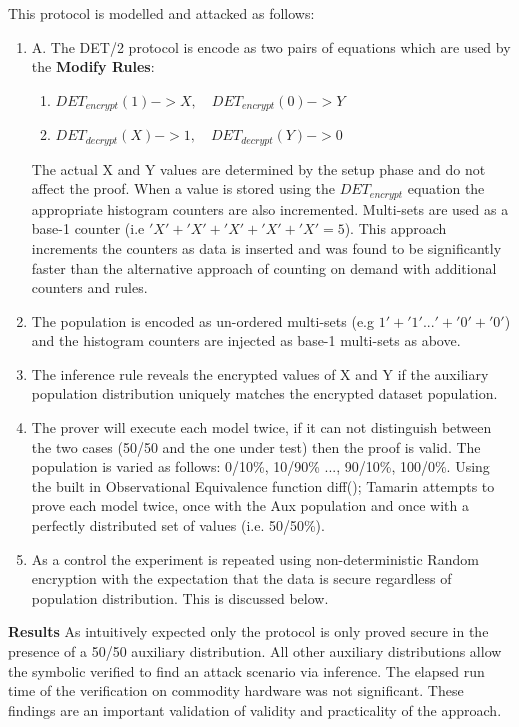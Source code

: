 \documentclass[journal]{IEEEtran}
\begin{document}
This protocol is modelled and attacked as follows:
\begin{enumerate}[label=(\Alph*)]
        \item A. The DET/2 protocol is encode as two pairs of equations which are used by the \textbf{Modify Rules}:
    \begin{enumerate}
        \item 	$DET_{encrypt}(1) -> X,\quad	DET_{encrypt}(0) -> Y$
    	\item 	$DET_{decrypt}(X) ->  1,\quad   DET_{decrypt}(Y) ->  0$
        
    \end{enumerate}
    The actual X and Y values are determined by the setup phase and do not affect the proof.
	When a value is stored using the $DET_{encrypt}$ equation the appropriate histogram counters are also incremented. Multi-sets are used as a base-1 counter (i.e $'X'+'X'+'X'+'X'+'X' = 5$).  This approach increments the counters as data is inserted and was found to be significantly faster than the alternative approach of counting on demand with additional counters and rules.
\item The \aux{} population is encoded as un-ordered multi-sets (e.g $ 1' + '1' ... ' + '0' + '0'$) and the \aux{} histogram counters are injected as base-1 multi-sets as above. 
\item The inference rule reveals the encrypted values of X and Y if the auxiliary population distribution uniquely matches the encrypted dataset population.
\item The prover will execute each model twice, if it can not distinguish between the two cases (50/50 and the one under test) then the proof is valid. The population is varied as follows: 0/10\%, 10/90\% ..., 90/10\%, 100/0\%. 
Using the built in Observational Equivalence function diff(); Tamarin attempts to prove each model twice, once with the Aux population and once with a perfectly distributed set of values (i.e. 50/50\%). 
\item As a control the experiment is repeated using non-deterministic Random encryption with the expectation that the data is secure regardless of population distribution. This is discussed below.
\end{enumerate}
\textbf{Results} As intuitively expected only the protocol is only proved secure in the presence of a 50/50 auxiliary distribution. All other auxiliary distributions allow the symbolic verified to find an attack scenario via inference. The elapsed run time of the verification on commodity hardware was not significant. These findings are an important validation of validity and practicality of the approach.
\end{document}
